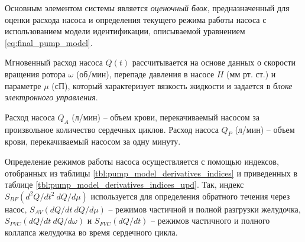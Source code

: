 Основным элементом системы является \textit{оценочный блок}, предназначенный для оценки расхода насоса и определения текущего режима работы насоса с использованием модели идентификации, описываемой уравнением \eqref{eq:final_pump_model}. 

Мгновенный расход насоса $Q(t)$ рассчитывается на основе данных о скорости вращения ротора $\omega$ (об/мин), перепаде давления в насосе $H$ (мм рт. ст.) и параметре $\mu$ (сП), который характеризует вязкость жидкости и задается в \textit{блоке электронного управления}.

Расход насоса $Q_A$ (л/мин) -- объем крови, перекачиваемый насосом за произвольное количество сердечных циклов. Расход насоса $Q_P$ (л/мин) -- объем крови, перекачиваемый насосом за одну минуту. 


Определение режимов работы насоса осуществляется с помощью индексов, отобранных из таблицы \ref{tbl:pump_model_derivatives_indices} и приведенных в таблице \ref{tbl:pump_model_derivatives_indices_upd}. Так, индекс $S_{BF}(d^2Q/dt^2~dQ/d\mu)$ используется для определения обратного течения через насос, $S_{AV}(dQ/dt~dQ/d\mu)$ -- режимов частичной и полной разгрузки желудочка, $S_{PVC}(dQ/dt~dQ/d\omega)$ и $S_{FVC}(dQ/dt)$ -- режимов частичного и полного коллапса желудочка во время сердечного цикла. 

